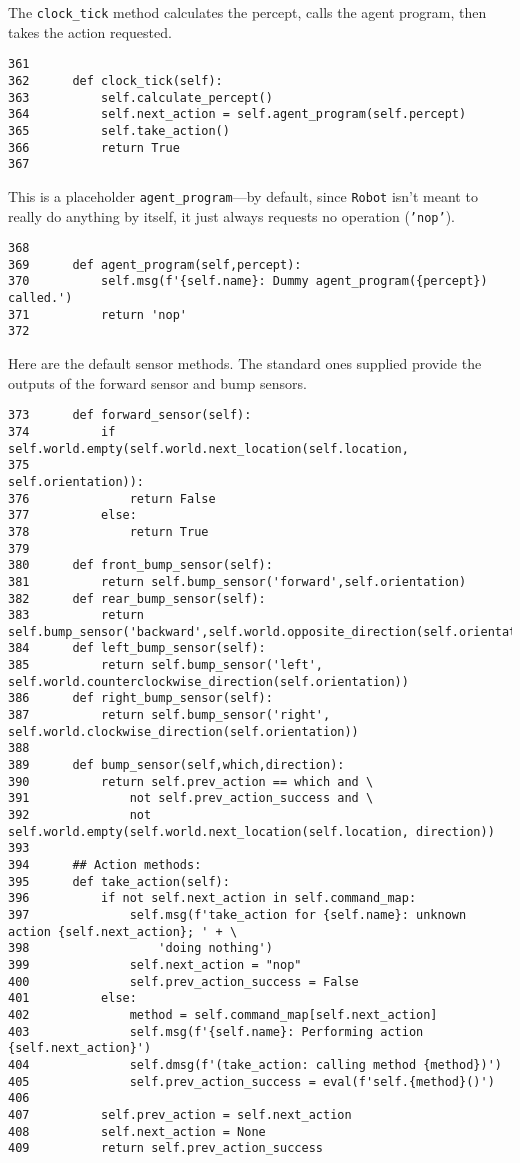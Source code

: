 \documentclass[11pt]{tufte-handout}
\begin{document}
The \texttt{clock\_tick} method calculates the percept, calls the agent program, then takes the action requested.

\begin{verbatim}
361  
362      def clock_tick(self):
363          self.calculate_percept()
364          self.next_action = self.agent_program(self.percept)
365          self.take_action()
366          return True
367  
\end{verbatim}

This is a placeholder \texttt{agent\_program}---by default, since \texttt{Robot} isn't meant to really do anything by itself, it just always requests no operation (\texttt{'nop'}).

\begin{verbatim}
368  
369      def agent_program(self,percept):
370          self.msg(f'{self.name}: Dummy agent_program({percept}) called.')
371          return 'nop'
372  
\end{verbatim}

Here are the default sensor methods.  The standard ones supplied provide the outputs of the forward sensor and bump sensors.

\begin{verbatim}
373      def forward_sensor(self):
374          if self.world.empty(self.world.next_location(self.location,
375                                                       self.orientation)):
376              return False
377          else:
378              return True
379  
380      def front_bump_sensor(self):
381          return self.bump_sensor('forward',self.orientation)
382      def rear_bump_sensor(self):
383          return self.bump_sensor('backward',self.world.opposite_direction(self.orientation))
384      def left_bump_sensor(self):
385          return self.bump_sensor('left', self.world.counterclockwise_direction(self.orientation))
386      def right_bump_sensor(self):
387          return self.bump_sensor('right', self.world.clockwise_direction(self.orientation))
388  
389      def bump_sensor(self,which,direction):
390          return self.prev_action == which and \
391              not self.prev_action_success and \
392              not self.world.empty(self.world.next_location(self.location, direction))
393  
394      ## Action methods:
395      def take_action(self):
396          if not self.next_action in self.command_map:
397              self.msg(f'take_action for {self.name}: unknown action {self.next_action}; ' + \
398                  'doing nothing')
399              self.next_action = "nop"
400              self.prev_action_success = False
401          else:
402              method = self.command_map[self.next_action]
403              self.msg(f'{self.name}: Performing action {self.next_action}')
404              self.dmsg(f'(take_action: calling method {method})')
405              self.prev_action_success = eval(f'self.{method}()')
406  
407          self.prev_action = self.next_action
408          self.next_action = None
409          return self.prev_action_success
\end{verbatim}
\end{document}
